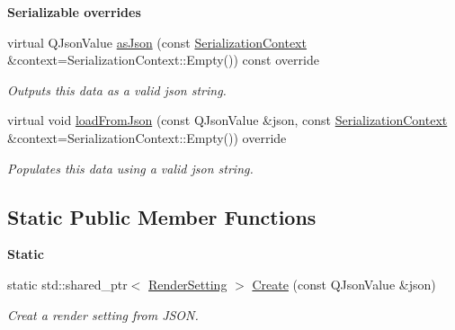\begin{Indent}\textbf{ Serializable overrides}\par
\begin{DoxyCompactItemize}
\item 
\mbox{\label{classrev_1_1_render_setting_a3556177d8908d11717e84227e503ef9b}} 
virtual Q\+Json\+Value \mbox{\hyperlink{classrev_1_1_render_setting_a3556177d8908d11717e84227e503ef9b}{as\+Json}} (const \mbox{\hyperlink{structrev_1_1_serialization_context}{Serialization\+Context}} \&context=Serialization\+Context\+::\+Empty()) const override
\begin{DoxyCompactList}\small\item\em Outputs this data as a valid json string. \end{DoxyCompactList}\item 
\mbox{\label{classrev_1_1_render_setting_a50a744d8c17df4e61ce2c36e06164d3f}} 
virtual void \mbox{\hyperlink{classrev_1_1_render_setting_a50a744d8c17df4e61ce2c36e06164d3f}{load\+From\+Json}} (const Q\+Json\+Value \&json, const \mbox{\hyperlink{structrev_1_1_serialization_context}{Serialization\+Context}} \&context=Serialization\+Context\+::\+Empty()) override
\begin{DoxyCompactList}\small\item\em Populates this data using a valid json string. \end{DoxyCompactList}\end{DoxyCompactItemize}
\end{Indent}
\subsection*{Static Public Member Functions}
\begin{Indent}\textbf{ Static}\par
\begin{DoxyCompactItemize}
\item 
\mbox{\label{classrev_1_1_render_setting_ac53fdf6d60af40a524bc248083fce710}} 
static std\+::shared\+\_\+ptr$<$ \mbox{\hyperlink{classrev_1_1_render_setting}{Render\+Setting}} $>$ \mbox{\hyperlink{classrev_1_1_render_setting_ac53fdf6d60af40a524bc248083fce710}{Create}} (const Q\+Json\+Value \&json)
\begin{DoxyCompactList}\small\item\em Creat a render setting from J\+S\+ON. \end{DoxyCompactList}\end{DoxyCompactItemize}
\end{Indent}
